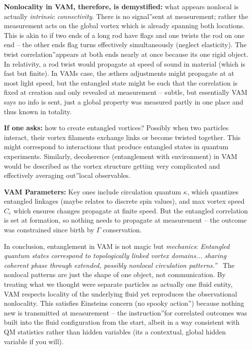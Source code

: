 \documentclass[a4paper, aps,preprint,superscriptaddress, 12pt]{revtex4}
\begin{document}
\textbf{Nonlocality in VAM, therefore, is demystified:} what appears nonlocal is actually \textit{intrinsic connectivity}. There is no \grqq signal\textquotedblright sent at measurement; rather the measurement acts on the global vortex which is already spanning both locations. This is akin to if two ends of a long rod have flags and one twists the rod on one end – the other end\rqs s flag turns effectively simultaneously (neglect elasticity). The twist \grqq correlation\textquotedblright appears at both ends nearly at once because it\rqs s one rigid object. In relativity, a rod twist would propagate at speed of sound in material (which is fast but finite). In VAM\rqs s case, the æther\rqs s adjustments might propagate at at most light speed, but the entangled state might be such that the correlation is fixed at creation and only revealed at measurement – subtle, but essentially VAM says no info is sent, just a global property was measured partly in one place and thus known in totality.


\textbf{If one asks:} how to create entangled vortices? Possibly when two particles interact, their vortex filaments exchange links or become twisted together. This might correspond to interactions that produce entangled states in quantum experiments. Similarly, decoherence (entanglement with environment) in VAM would be described as the vortex structure getting very complicated and effectively \grqq averaging out\textquotedblright local observables.


\textbf{VAM Parameters:} Key ones include circulation quantum $\kappa$, which quantizes entangled linkages (maybe relates to discrete spin values), and max vortex speed $C_e$ which ensures changes propagate at finite speed. But the entangled correlation is set at formation, so nothing needs to propagate at measurement – the outcome was constrained since birth by $\Gamma$ conservation.


In conclusion, entanglement in VAM is not magic but \textit{mechanics}: \textit{\grqq Entangled quantum states correspond to topologically linked vortex domains... sharing coherent phase through extended, possibly nonlocal circulation patterns.\textquotedblright}~\cite{Iskandarani2025c}  The nonlocal patterns are just the shape of one object, not communication. By treating what we thought were separate particles as actually one fluid entity, VAM respects locality of the underlying fluid yet reproduces the observational nonlocality. This satisfies Einstein\rqs s concern (\grqq no spooky action\textquotedblright) because nothing new is transmitted at measurement – the \grqq instruction\textquotedblright for correlated outcomes was built into the fluid configuration from the start, albeit in a way consistent with QM statistics rather than hidden variables (it\rqs s a contextual, global hidden variable if you will).
\end{document}
